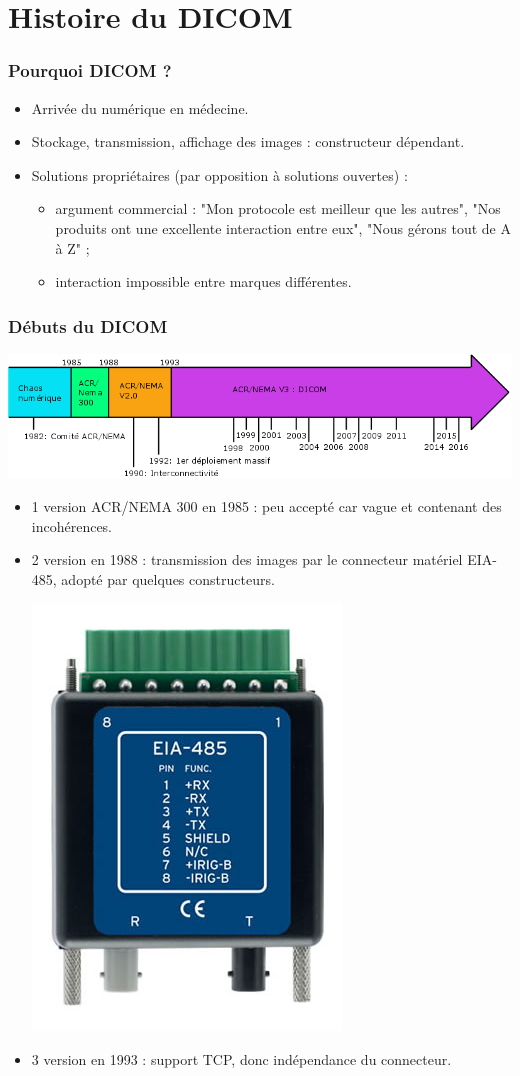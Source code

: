 \section{Histoire du DICOM}

	\frame
	{
		\frametitle{Pourquoi DICOM ?}
		
		\begin{itemize}
			\item Arriv\'ee du num\'erique en m\'edecine.
			\item Stockage, transmission, affichage des images : constructeur d\'ependant.
			\item Solutions propri\'etaires (par opposition \`a solutions ouvertes) :
			\begin{itemize}
				\item argument commercial : "Mon protocole est meilleur que les autres", "Nos produits ont une excellente interaction entre eux", "Nous g\'erons tout de A \`a Z" ;
				\item interaction impossible entre marques diff\'erentes.
			\end{itemize} 
		\end{itemize} 
	}
					
	\frame
	{
		\frametitle{D\'ebuts du DICOM}
		\includegraphics[width=\linewidth]{./figures/chrono-dicom.png}

		\begin{itemize}
			\item 1 version ACR/NEMA 300 en 1985 : peu accept\'e car vague et contenant des incoh\'erences.
			\item 2 version en 1988 : transmission des images par le connecteur mat\'eriel EIA-485, adopt\'e par quelques constructeurs.

		        \includegraphics[width=.15\linewidth]{./figures/eia-485.png}
			\item 3 version en 1993 : support TCP, donc ind\'ependance du connecteur.
		\end{itemize}
	}
	
